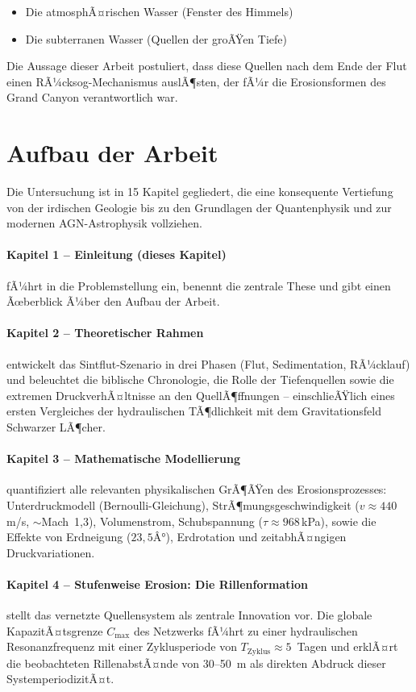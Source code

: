 ﻿\documentclass[12pt,a4paper]{report}
\begin{document}
\begin{itemize}
	\item Die atmosphÃ¤rischen Wasser (Fenster des Himmels)
	\item Die subterranen Wasser (Quellen der groÃŸen Tiefe)
\end{itemize}

Die Aussage dieser Arbeit postuliert, dass diese Quellen nach dem Ende der Flut einen RÃ¼cksog-Mechanismus auslÃ¶sten, der fÃ¼r die Erosionsformen des Grand Canyon verantwortlich war.

\section{Aufbau der Arbeit}

Die Untersuchung ist in 15 Kapitel gegliedert, die eine konsequente Vertiefung von der irdischen Geologie bis zu den Grundlagen der Quantenphysik und zur modernen AGN-Astrophysik vollziehen.

\paragraph{Kapitel 1 -- Einleitung (dieses Kapitel)}
fÃ¼hrt in die Problemstellung ein, benennt die zentrale These und gibt einen Ãœberblick Ã¼ber den Aufbau der Arbeit.

\paragraph{Kapitel 2 -- Theoretischer Rahmen}
entwickelt das Sintflut-Szenario in drei Phasen (Flut, Sedimentation, RÃ¼cklauf) und beleuchtet die biblische Chronologie, die Rolle der Tiefenquellen sowie die extremen DruckverhÃ¤ltnisse an den QuellÃ¶ffnungen -- einschlieÃŸlich eines ersten Vergleiches der hydraulischen TÃ¶dlichkeit mit dem Gravitationsfeld Schwarzer LÃ¶cher.

\paragraph{Kapitel 3 -- Mathematische Modellierung}
quantifiziert alle relevanten physikalischen GrÃ¶ÃŸen des Erosionsprozesses: Unterdruckmodell (Bernoulli-Gleichung), StrÃ¶mungsge\-schwindigkeit ($v \approx 440$\,m/s, $\sim$Mach~1,3), Volumenstrom, Schubspannung ($\tau \approx 968$\,kPa), sowie die Effekte von Erdneigung ($23{,}5Â°$), Erdrotation und zeitabhÃ¤ngigen Druckvariationen.

\paragraph{Kapitel 4 -- Stufenweise Erosion: Die Rillenformation}
stellt das vernetzte Quellensystem als zentrale Innovation vor. Die globale KapazitÃ¤tsgrenze $C_\mathrm{max}$ des Netzwerks fÃ¼hrt zu einer hydraulischen Resonanzfrequenz mit einer Zyklusperiode von $T_\mathrm{Zyklus} \approx 5$~Tagen und erklÃ¤rt die beobachteten RillenabstÃ¤nde von 30--50~m als direkten Abdruck dieser SystemperiodizitÃ¤t.
\end{document}
